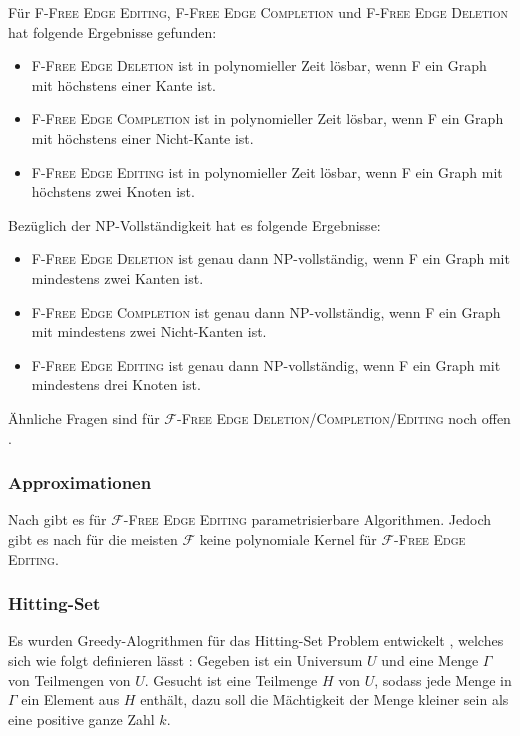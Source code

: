 \documentclass[12pt,a4paper,onecolumn,oneside,titlepage]{article}
\newcommand\cursive[1]{\ensuremath{\mathcal{#1}}}
\begin{document}
Für \textsc{F-Free Edge Editing}, \textsc{F-Free Edge Completion} und \textsc{F-Free Edge Deletion} hat \cite{AravindSS15} folgende Ergebnisse gefunden:
\begin{itemize}
 \item \textsc{F-Free Edge Deletion} ist in polynomieller Zeit lösbar, wenn F ein Graph mit höchstens einer Kante ist.
 \item \textsc{F-Free Edge Completion} ist in polynomieller Zeit lösbar, wenn F ein Graph mit höchstens einer Nicht-Kante ist.
 \item \textsc{F-Free Edge Editing} ist in polynomieller Zeit lösbar, wenn F ein Graph mit höchstens zwei Knoten ist.
\end{itemize}
Bezüglich der NP-Vollständigkeit hat es folgende Ergebnisse:
\begin{itemize}
 \item \textsc{F-Free Edge Deletion} ist genau dann NP-vollständig, wenn F ein Graph mit mindestens zwei Kanten ist.
 \item \textsc{F-Free Edge Completion} ist genau dann NP-vollständig, wenn F ein Graph mit mindestens zwei Nicht-Kanten ist.
 \item \textsc{F-Free Edge Editing} ist genau dann NP-vollständig, wenn F ein Graph mit mindestens drei Knoten ist.
\end{itemize}
Ähnliche Fragen sind für \textsc{\cursive{F}-Free Edge Deletion/Completion/Editing} noch offen \cite{AravindSS15}.

\subsubsection{Approximationen}
Nach \cite{Cai96} gibt es für \textsc{\cursive{F}-Free Edge Editing} parametrisierbare Algorithmen. Jedoch gibt es nach \cite{Kratsch13} für die meisten \cursive{F} keine polynomiale Kernel für \textsc{\cursive{F}-Free Edge Editing}.

\subsubsection{Hitting-Set}
Es wurden Greedy-Alogrithmen für das Hitting-Set Problem entwickelt \cite{Moreno13}, welches sich wie folgt definieren lässt \cite{Karp72}: Gegeben ist ein Universum $U$ und eine Menge $\Gamma$ von Teilmengen von $U$. Gesucht ist eine Teilmenge $H$ von $U$, sodass jede Menge in $\Gamma$ ein Element aus $H$ enthält, dazu soll die Mächtigkeit der Menge kleiner sein als eine positive ganze Zahl $k$.
\end{document}
